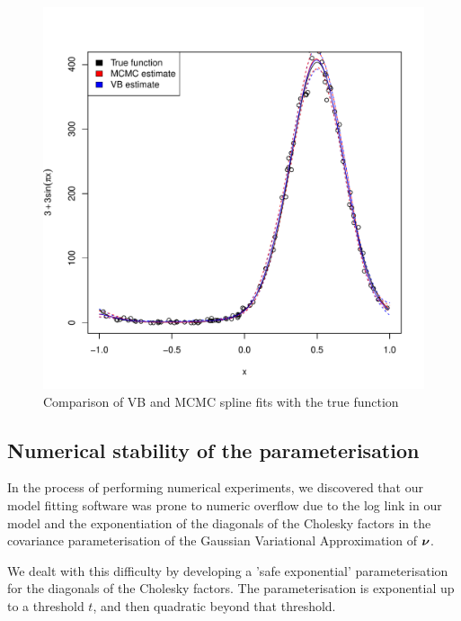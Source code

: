 \begin{figure}[h]
	\label{fig:spline}
	\caption{Comparison of VB and MCMC spline fits with the true function}
	\includegraphics[width=0.95 \textwidth]{code/results/accuracy_plots_spline_gva2.pdf}
\end{figure}
		
		
\subsection{Numerical stability of the parameterisation}

In the process of performing numerical experiments, we discovered that our model fitting software was
prone to numeric overflow due to the log link in our model and the exponentiation of the diagonals of
the Cholesky factors in the covariance parameterisation of the Gaussian Variational Approximation of
${\boldsymbol \nu}$.

We dealt with this difficulty by developing a 'safe exponential' parameterisation for the diagonals of
the Cholesky factors. The parameterisation is exponential up to a threshold $t$, and then quadratic
beyond that threshold.

